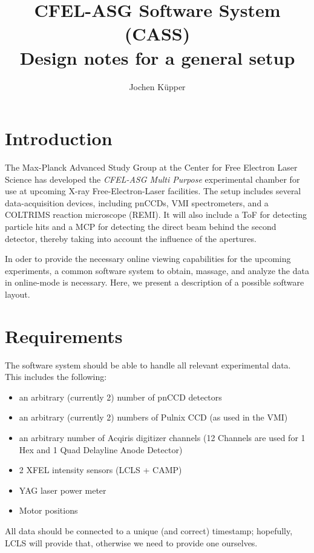 \documentclass[11pt,a4paper,oneside]{article}
\begin{document}
\title{CFEL-ASG Software System (CASS) \\
   Design notes for a general setup}
\author{Jochen K\"{u}pper}
\maketitle

\section{Introduction}
\label{sec:introduction}

The Max-Planck Advanced Study Group at the Center for Free Electron Laser Science has developed the \emph{CFEL-ASG Multi Purpose} experimental chamber for use at upcoming X-ray Free-Electron-Laser facilities. The setup includes several data-acquisition devices, including pnCCDs, VMI spectrometers, and a COLTRIMS reaction microscope (REMI). It will also include a ToF for detecting particle hits and a MCP for detecting the direct beam behind the second detector, thereby taking into account the influence of the apertures.

In oder to provide the necessary online viewing capabilities for the upcoming experiments, a common software system to obtain, massage, and analyze the data in online-mode is necessary. Here, we present a description of a possible software layout.


\section{Requirements}
\label{sec:requirements}

The software system should be able to handle all relevant experimental data. This includes the following:
\begin{itemize}
\item an arbitrary (currently 2) number of pnCCD detectors
\item an arbitrary (currently 2) numbers of Pulnix CCD (as used in the VMI)
\item an arbitrary number of Acqiris digitizer channels (12 Channels are used for 1 Hex and 1 Quad Delayline Anode Detector)
\item 2 XFEL intensity sensors (LCLS + CAMP)
\item YAG laser power meter
\item Motor positions
\end{itemize}
All data should be connected to a unique (and correct) timestamp; hopefully, LCLS will provide that, otherwise we need to provide one ourselves.
\end{document}
